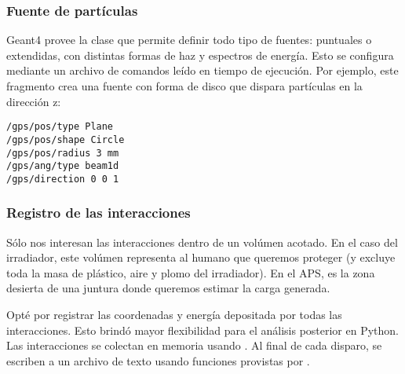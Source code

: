 \subsubsection{Fuente de partículas}
Geant4 provee la clase 
que permite definir todo tipo de fuentes:
puntuales o extendidas, con distintas formas de haz y espectros de energía.
Esto se configura mediante un archivo de comandos 
leído en tiempo de ejecución.
Por ejemplo, este fragmento crea una fuente 
con forma de disco que dispara partículas en la dirección z:
\begin{verbatim}
/gps/pos/type Plane
/gps/pos/shape Circle
/gps/pos/radius 3 mm
/gps/ang/type beam1d
/gps/direction 0 0 1
\end{verbatim}
\subsubsection{Registro de las interacciones}
Sólo nos interesan las interacciones dentro de un volúmen acotado.
En el caso del irradiador, este volúmen representa al humano que queremos
proteger (y excluye toda la masa de plástico, aire y plomo del irradiador). 
En el APS, es la zona desierta de una juntura donde queremos estimar la
carga generada.

Opté por registrar las coordenadas y energía depositada
por todas las interacciones.
Esto brindó mayor flexibilidad para el análisis posterior en Python.
Las interacciones se colectan en memoria usando .
Al final de cada disparo, se escriben a un archivo de texto
usando funciones provistas por .
